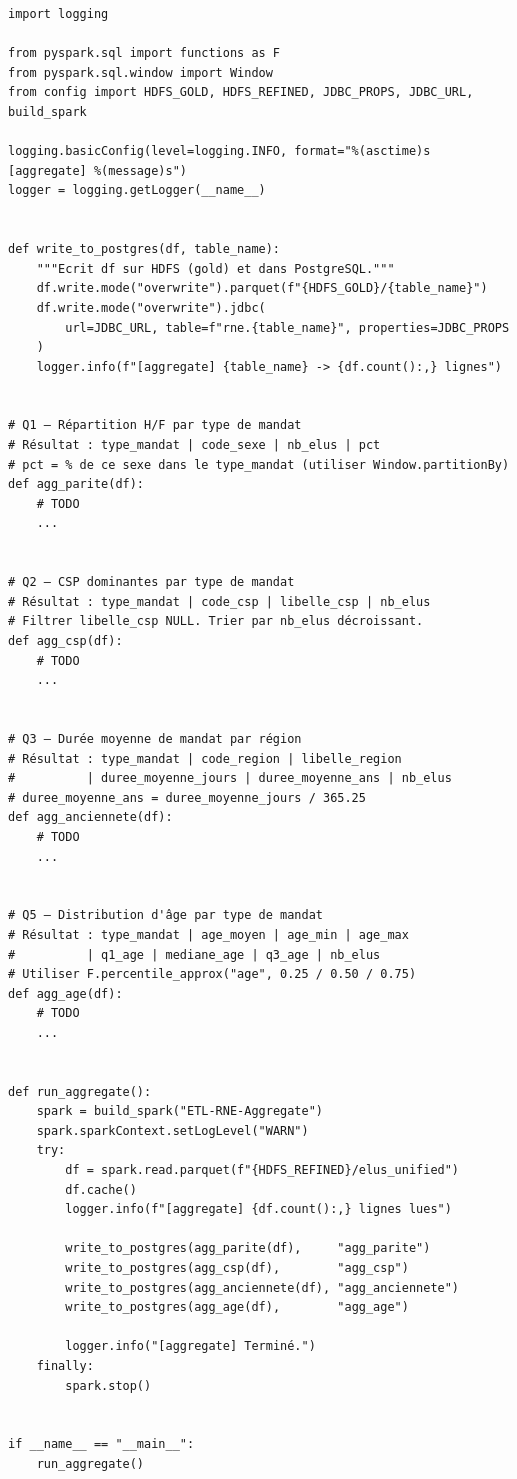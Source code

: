 \documentclass[11pt,a4paper]{article}
\begin{document}
\begin{lstlisting}
import logging

from pyspark.sql import functions as F
from pyspark.sql.window import Window
from config import HDFS_GOLD, HDFS_REFINED, JDBC_PROPS, JDBC_URL, build_spark

logging.basicConfig(level=logging.INFO, format="%(asctime)s [aggregate] %(message)s")
logger = logging.getLogger(__name__)


def write_to_postgres(df, table_name):
    """Ecrit df sur HDFS (gold) et dans PostgreSQL."""
    df.write.mode("overwrite").parquet(f"{HDFS_GOLD}/{table_name}")
    df.write.mode("overwrite").jdbc(
        url=JDBC_URL, table=f"rne.{table_name}", properties=JDBC_PROPS
    )
    logger.info(f"[aggregate] {table_name} -> {df.count():,} lignes")


# Q1 — Répartition H/F par type de mandat
# Résultat : type_mandat | code_sexe | nb_elus | pct
# pct = % de ce sexe dans le type_mandat (utiliser Window.partitionBy)
def agg_parite(df):
    # TODO
    ...


# Q2 — CSP dominantes par type de mandat
# Résultat : type_mandat | code_csp | libelle_csp | nb_elus
# Filtrer libelle_csp NULL. Trier par nb_elus décroissant.
def agg_csp(df):
    # TODO
    ...


# Q3 — Durée moyenne de mandat par région
# Résultat : type_mandat | code_region | libelle_region
#          | duree_moyenne_jours | duree_moyenne_ans | nb_elus
# duree_moyenne_ans = duree_moyenne_jours / 365.25
def agg_anciennete(df):
    # TODO
    ...


# Q5 — Distribution d'âge par type de mandat
# Résultat : type_mandat | age_moyen | age_min | age_max
#          | q1_age | mediane_age | q3_age | nb_elus
# Utiliser F.percentile_approx("age", 0.25 / 0.50 / 0.75)
def agg_age(df):
    # TODO
    ...


def run_aggregate():
    spark = build_spark("ETL-RNE-Aggregate")
    spark.sparkContext.setLogLevel("WARN")
    try:
        df = spark.read.parquet(f"{HDFS_REFINED}/elus_unified")
        df.cache()
        logger.info(f"[aggregate] {df.count():,} lignes lues")

        write_to_postgres(agg_parite(df),     "agg_parite")
        write_to_postgres(agg_csp(df),        "agg_csp")
        write_to_postgres(agg_anciennete(df), "agg_anciennete")
        write_to_postgres(agg_age(df),        "agg_age")

        logger.info("[aggregate] Terminé.")
    finally:
        spark.stop()


if __name__ == "__main__":
    run_aggregate()
\end{lstlisting}
\end{document}
